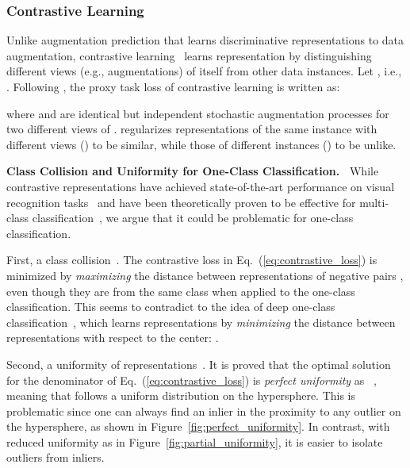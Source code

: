 \documentclass{article} \usepackage{iclr2021_conference,times}
\begin{document}
\subsubsection{Contrastive Learning}
\label{sec:contrastive_learning}
\vspace{-0.05in}
Unlike augmentation prediction that learns discriminative representations to data augmentation, contrastive learning~\citep{chen2020simple} learns representation by distinguishing different views (e.g., augmentations) of itself from other data instances. Let , i.e., . Following \cite{sohn2016improved}, the proxy task loss of contrastive learning is written as:
\iffalse

\fi

where  and  
are identical but independent 
stochastic augmentation processes for two different views of .
 regularizes representations of the same instance with different views () to be similar, while those of different instances () to be unlike. 
\iffalse
In practice, we use finite samples to approximate the inner expectation as

\fi

\textbf{Class Collision and Uniformity for One-Class Classification.~}
While contrastive representations have achieved state-of-the-art performance on visual recognition tasks~\citep{oord2018representation,henaff2019data,chen2020simple,wang2020understanding} and have been theoretically proven to be effective for multi-class classification~\citep{saunshi2019theoretical,tosh2020contrastive}, we argue that it could be problematic for one-class classification.

First, a class collision~\citep{saunshi2019theoretical}. The contrastive loss in Eq.~(\ref{eq:contrastive_loss}) is minimized by \emph{maximizing} the distance between representations of negative pairs , even though they are from the same class when applied to the one-class classification. This seems to contradict to the idea of deep one-class classification~\citep{ruff2018deep}, which learns representations by \emph{minimizing} the distance between representations with respect to the center: . 

Second, a uniformity of representations~\citep{wang2020understanding}. It is proved that the optimal solution for the denominator of Eq.~(\ref{eq:contrastive_loss}) is \emph{perfect uniformity} as ~\citep{wang2020understanding}, meaning that  follows a uniform distribution on the hypersphere. 
This is problematic since one can always find an inlier  in the proximity to any outlier  on the hypersphere, as shown in Figure~\ref{fig:perfect_uniformity}. In contrast, with reduced uniformity as in Figure~\ref{fig:partial_uniformity}, it is easier to isolate outliers from inliers.
\end{document}
